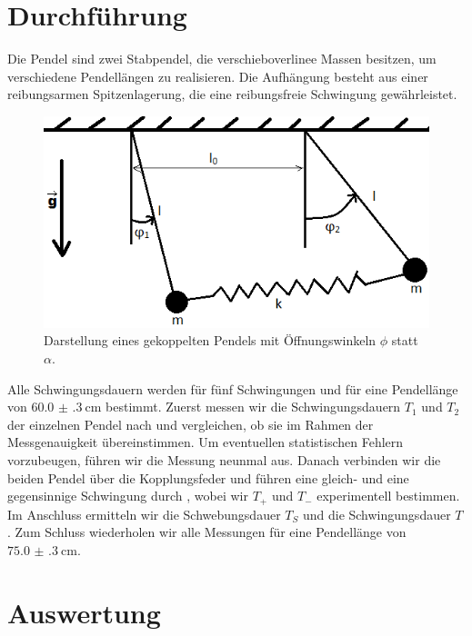 \section{Durchführung}
Die Pendel sind zwei Stabpendel, die verschieboverlinee Massen besitzen, um verschiedene Pendellängen zu realisieren. Die
Aufhängung besteht aus einer reibungsarmen Spitzenlagerung, die eine reibungsfreie Schwingung gewährleistet.
\begin{figure}[h]
  \centering
  \includegraphics{gekoppelte_pendel2.png}
  \caption{Darstellung eines gekoppelten Pendels mit Öffnungswinkeln $\phi$ statt $\alpha$.}
  \label{fig:skizze1}
\end{figure}
Alle Schwingungsdauern werden für fünf Schwingungen und für eine Pendellänge von $\SI{60.0(3)}{\centi\metre}$ bestimmt. Zuerst messen wir die Schwingungsdauern $\textit{T}_{1}$
und $\textit{T}_{2}$ der einzelnen Pendel nach und vergleichen, ob sie im Rahmen der Messgenauigkeit übereinstimmen. Um eventuellen
statistischen Fehlern vorzubeugen, führen wir die Messung neunmal aus. Danach verbinden wir die beiden Pendel über die Kopplungsfeder und führen eine gleich-
und eine gegensinnige Schwingung durch , wobei wir $\textit{T}_{+}$ und $\textit{T}_{-}$ experimentell bestimmen. Im
Anschluss ermitteln wir die Schwebungsdauer $\textit{T}_{S}$ und die Schwingungsdauer $\textit{T}$. Zum Schluss wiederholen wir
alle Messungen für eine Pendellänge von $\SI{75.0(3)}{\centi\metre}$.
\section{Auswertung}
